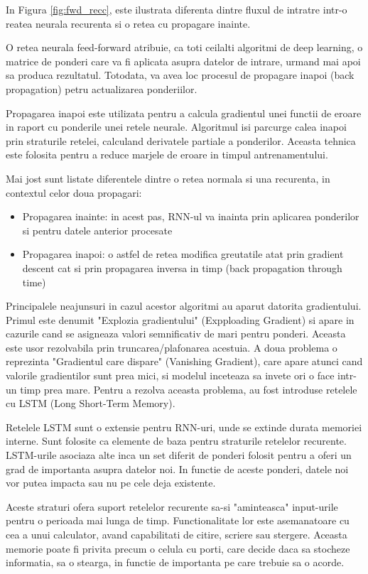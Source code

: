 \documentclass[a4paper, 12pt]{report}
\begin{document}
	In Figura \ref{fig:fwd_recc}, este ilustrata diferenta dintre fluxul de intratre intr-o reatea neurala recurenta si o retea cu propagare inainte.
	
	O retea neurala feed-forward atribuie, ca toti ceilalti algoritmi de deep learning, o matrice de ponderi care va fi aplicata asupra datelor de intrare, urmand mai apoi sa produca rezultatul. Totodata, va avea loc procesul de propagare inapoi (back propagation) petru actualizarea ponderiilor. 
	
	Propagarea inapoi este utilizata pentru a calcula gradientul unei functii de eroare in raport cu ponderile unei retele neurale. Algoritmul isi parcurge calea inapoi prin straturile retelei, calculand derivatele partiale a ponderilor. Aceasta tehnica este folosita pentru a reduce marjele de eroare in timpul antrenamentului.
	
	Mai jost sunt listate diferentele dintre o retea normala si una recurenta, in contextul celor doua propagari:
	\begin{itemize}
		\item Propagarea inainte: in acest pas, RNN-ul va inainta prin aplicarea ponderilor si pentru datele anterior procesate
		\item Propagarea inapoi: o astfel de retea modifica greutatile atat prin gradient descent cat si prin propagarea inversa in timp (back propagation through time)
	\end{itemize}

	Principalele neajunsuri in cazul acestor algoritmi au aparut datorita gradientului. Primul este denumit "Explozia gradientului" (Expploading Gradient) si apare in cazurile cand se asigneaza valori semnificativ de mari pentru ponderi. Aceasta este usor rezolvabila prin truncarea/plafonarea acestuia. A doua problema o reprezinta "Gradientul care dispare" (Vanishing Gradient), care apare atunci cand valorile gradientilor sunt prea mici, si modelul inceteaza sa invete ori o face intr-un timp prea mare. Pentru a rezolva aceasta problema, au fost introduse retelele cu LSTM (Long Short-Term Memory).
	
	Retelele LSTM sunt o extensie pentru RNN-uri, unde se extinde durata memoriei interne. Sunt folosite ca elemente de baza pentru straturile retelelor recurente. LSTM-urile asociaza alte inca un set diferit de ponderi folosit pentru a oferi un grad de importanta asupra datelor noi. In functie de aceste ponderi, datele noi vor putea impacta sau nu pe cele deja existente.
	
	Aceste straturi ofera suport retelelor recurente sa-si "aminteasca" input-urile pentru o perioada mai lunga de timp. Functionalitate lor este asemanatoare cu cea a unui calculator, avand capabilitati de citire, scriere sau stergere. Aceasta memorie poate fi privita precum o celula cu porti, care decide daca sa stocheze informatia, sa o stearga, in functie de importanta pe care trebuie sa o acorde.
	
\end{document}
